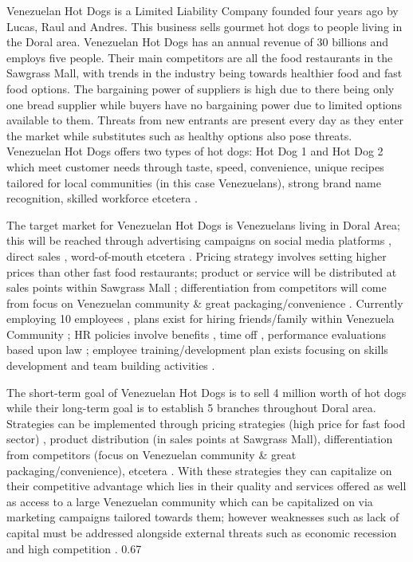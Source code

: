

Venezuelan Hot Dogs is a Limited Liability Company founded four years ago by Lucas, Raul and Andres. This business sells gourmet hot dogs to people living in the Doral area. Venezuelan Hot Dogs has an annual revenue of 30 billions and employs five people. Their main competitors are all the food restaurants in the Sawgrass Mall, with trends in the industry being towards healthier food and fast food options. The bargaining power of suppliers is high due to there being only one bread supplier while buyers have no bargaining power due to limited options available to them. Threats from new entrants are present every day as they enter the market while substitutes such as healthy options also pose threats. Venezuelan Hot Dogs offers two types of hot dogs: Hot Dog 1 and Hot Dog 2 which meet customer needs through taste, speed, convenience, unique recipes tailored for local communities (in this case Venezuelans), strong brand name recognition, skilled workforce etcetera . 

The target market for Venezuelan Hot Dogs is Venezuelans living in Doral Area; this will be reached through advertising campaigns on social media platforms , direct sales , word-of-mouth etcetera . Pricing strategy involves setting higher prices than other fast food restaurants; product or service will be distributed at sales points within Sawgrass Mall ; differentiation from competitors will come from focus on Venezuelan community & great packaging/convenience . Currently employing 10 employees , plans exist for hiring friends/family within Venezuela Community ; HR policies involve benefits , time off , performance evaluations based upon law ; employee training/development plan exists focusing on skills development and team building activities . 

The short-term goal of Venezuelan Hot Dogs is to sell 4 million worth of hot dogs while their long-term goal is to establish 5 branches throughout Doral area. Strategies can be implemented through pricing strategies (high price for fast food sector) , product distribution (in sales points at Sawgrass Mall), differentiation from competitors (focus on Venezuelan community & great packaging/convenience), etcetera . With these strategies they can capitalize on their competitive advantage which lies in their quality and services offered as well as access to a large Venezuelan community which can be capitalized on via marketing campaigns tailored towards them; however weaknesses such as lack of capital must be addressed alongside external threats such as economic recession and high competition .  0.67 %

